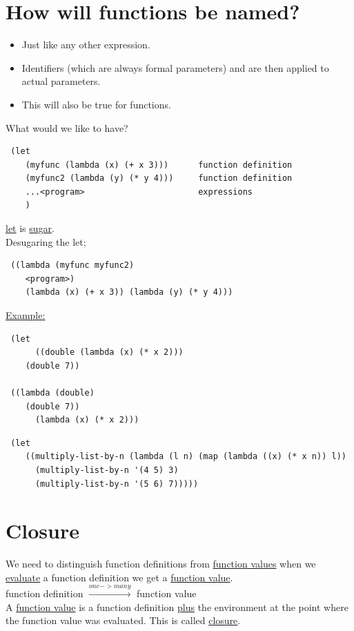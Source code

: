 \documentclass{article}
\begin{document}
\begin{flushleft}
\section{How will functions be named?}
\begin{flushleft}
\begin{itemize}
 \item Just like any other expression.
 \item Identifiers (which are always formal parameters) and are then applied to actual parameters.
 \item This will also be true for functions.
\end{itemize}
\bigskip
What would we like to have?\\
\begin{verbatim}
 (let
    (myfunc (lambda (x) (+ x 3)))      function definition
    (myfunc2 (lambda (y) (* y 4)))     function definition
    ...<program>                       expressions
    )
\end{verbatim}
\underline{let} is \underline{sugar}.\\
Desugaring the let;
\begin{verbatim}
 ((lambda (myfunc myfunc2)
    <program>)
    (lambda (x) (+ x 3)) (lambda (y) (* y 4)))
\end{verbatim}
\underline{Example:}
\begin{verbatim}
 (let
      ((double (lambda (x) (* x 2)))
    (double 7))
 
 ((lambda (double)
    (double 7))
      (lambda (x) (* x 2)))
\end{verbatim}
\begin{verbatim}
 (let
    ((multiply-list-by-n (lambda (l n) (map (lambda ((x) (* x n)) l))
      (multiply-list-by-n '(4 5) 3)
      (multiply-list-by-n '(5 6) 7)))))
\end{verbatim}
\end{flushleft}

\section{Closure}
\begin{flushleft}
 We need to distinguish function definitions from \underline{function values} when we \underline{evaluate} a function definition we get a \underline{function value}.\\
 \bigskip
 function definition $\xrightarrow{one->many}$ function value\\
 \bigskip
 A \underline{function value} is a function definition \underline{plus} the environment at the point where the function value was evaluated. This is called \underline{closure}.
\end{flushleft}


\end{flushleft}
\end{document}
